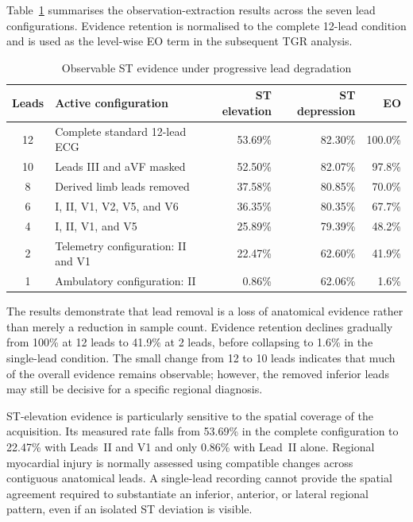 \documentclass{ssnreview}
\begin{document}
Table~\ref{tab:evidence-retention} summarises the observation-extraction results across the
seven lead configurations. Evidence retention is normalised to the complete 12-lead
condition and is used as the level-wise EO term in the subsequent TGR analysis.

\begin{table}[H]
  \centering
  \small
  \caption{Observable ST evidence under progressive lead degradation}
  \label{tab:evidence-retention}
  \begin{tabularx}{\textwidth}{@{}c>{\raggedright\arraybackslash}Xrrr@{}}
    \toprule
    \textbf{Leads} & \textbf{Active configuration} &
    \textbf{ST elevation} & \textbf{ST depression} &
    \textbf{EO} \\
    \midrule
    12 & Complete standard 12-lead ECG & 53.69\% & 82.30\% & 100.0\% \\
    10 & Leads III and aVF masked & 52.50\% & 82.07\% & 97.8\% \\
    8 & Derived limb leads removed & 37.58\% & 80.85\% & 70.0\% \\
    6 & I, II, V1, V2, V5, and V6 & 36.35\% & 80.35\% & 67.7\% \\
    4 & I, II, V1, and V5 & 25.89\% & 79.39\% & 48.2\% \\
    2 & Telemetry configuration: II and V1 & 22.47\% & 62.60\% & 41.9\% \\
    1 & Ambulatory configuration: II & 0.86\% & 62.06\% & 1.6\% \\
    \bottomrule
  \end{tabularx}
\end{table}

The results demonstrate that lead removal is a loss of anatomical evidence rather than
merely a reduction in sample count. Evidence retention declines gradually from 100\% at
12 leads to 41.9\% at 2 leads, before collapsing to 1.6\% in the single-lead condition.
The small change from 12 to 10 leads indicates that much of the overall evidence remains
observable; however, the removed inferior leads may still be decisive for a specific
regional diagnosis.

ST-elevation evidence is particularly sensitive to the spatial coverage of the acquisition.
Its measured rate falls from 53.69\% in the complete configuration to 22.47\% with
Leads~II and V1 and only 0.86\% with Lead~II alone. Regional myocardial injury is
normally assessed using compatible changes across contiguous anatomical leads. A
single-lead recording cannot provide the spatial agreement required to substantiate an
inferior, anterior, or lateral regional pattern, even if an isolated ST deviation is visible.
\end{document}
